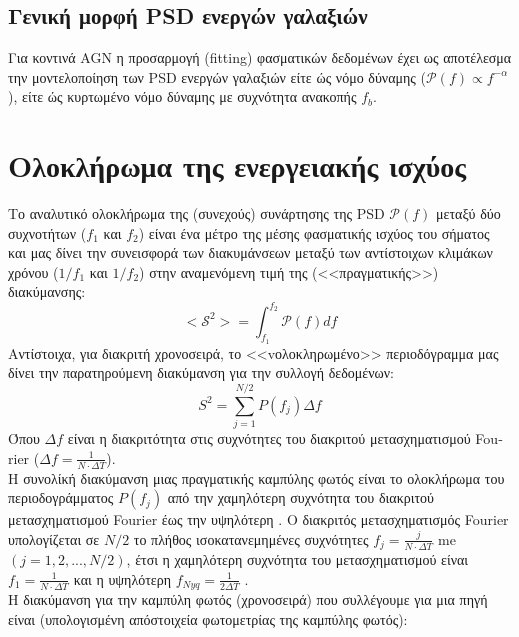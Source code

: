 \subsection{Γενική μορφή \textlatin{PSD} ενεργών γαλαξιών}
Για κοντινά \textlatin{AGN} η προσαρμογή (\textlatin{fitting}) φασματικών δεδομένων  έχει ως αποτέλεσμα την μοντελοποίηση των \textlatin{PSD} ενεργών γαλαξιών είτε ώς νόμο δύναμης ($\mathcal{P}(f)\propto f^{-\alpha}$), είτε ώς κυρτωμένο νόμο δύναμης με συχνότητα ανακοπής $f_b$\cite{2017MNRAS.471.4398P}.
 
\section{Ολοκλήρωμα της ενεργειακής ισχύος}

Το αναλυτικό ολοκλήρωμα της (συνεχούς) συνάρτησης της \textlatin{PSD} $\mathcal{P}(f)$ μεταξύ δύο συχνοτήτων ($f_1$ και $f_2$) είναι ένα μέτρο της μέσης φασματικής ισχύος του σήματος και μας δίνει την συνεισφορά των διακυμάνσεων μεταξύ των αντίστοιχων κλιμάκων χρόνου ($1/f_1$ και $1/f_2$) στην αναμενόμενη τιμή της (<<πραγματικής>>) διακύμανσης\cite{2003MNRAS.345.1271V}:
\begin{equation} <\mathcal{S}^2> = \int_{f_1}^{f_2} \mathcal{P}(f)df  \label{eq:integratedPSD} \end{equation}
Αντίστοιχα, για διακριτή χρονοσειρά, το <<vολοκληρωμένο>> περιοδόγραμμα μας δίνει την παρατηρούμενη διακύμανση για την συλλογή δεδομένων\cite{2003MNRAS.345.1271V}: 
\begin{equation} S^2 = \sum_{j=1}^{N/2} P(f_j)\Delta f \label{eq:integratedperiodogram} \end{equation}
Όπου $\Delta f$ είναι η διακριτότητα στις συχνότητες του διακριτού μετασχηματισμού \textlatin{Fourier} ($\Delta f = \frac{1}{N\cdot \Delta T}$). \\
Η συνολίκή διακύμανση μιας πραγματικής καμπύλης φωτός είναι το ολοκλήρωμα του περιοδογράμματος $P(f_j)$ από την χαμηλότερη συχνότητα του διακριτού μετασχηματισμού \textlatin{Fourier} έως την υψηλότερη \cite{2003MNRAS.345.1271V}. Ο διακριτός μετασχηματισμός \textlatin{Fourier} υπολογίζεται σε $Ν/2$ το πλήθος ισοκατανεμημένες συχνότητες $f_j = \frac{j}{N\cdot \Delta T}$ me $(j = 1, 2, . . . , N/2)$, έτσι η χαμηλότερη συχνότητα του μετασχηματισμού είναι $f_1 = \frac{1}{N \cdot \Delta T}$ και η υψηλότερη $f_{Nyq} = \frac{1}{2  \Delta T}$ \cite{Vaughan2}.\\
H διακύμανση για την καμπύλη φωτός (χρονοσειρά) που συλλέγουμε για μια πηγή είναι (υπολογισμένη απόστοιχεία φωτομετρίας της καμπύλης φωτός): 
